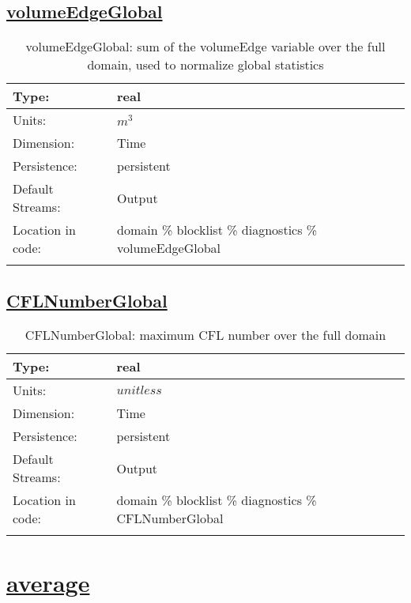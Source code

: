 \subsection[volumeEdgeGlobal]{\hyperref[sec:var_tab_diagnostics]{volumeEdgeGlobal}}
\label{subsec:var_sec_diagnostics_volumeEdgeGlobal}
\begin{center}
\begin{longtable}{| p{2.0in} | p{4.0in} |}
        \hline 
        Type: & real \\
        \hline 
        Units: & $m^3$ \\
        \hline 
        Dimension: & Time \\
        \hline 
        Persistence: & persistent \\
        \hline 
		 Default Streams: & Output  \\
        \hline 
		 Location in code: & domain \% blocklist \% diagnostics \% volumeEdgeGlobal \\
		 \hline 
    \caption{volumeEdgeGlobal: sum of the volumeEdge variable over the full domain, used to normalize global statistics}
\end{longtable}
\end{center}
\subsection[CFLNumberGlobal]{\hyperref[sec:var_tab_diagnostics]{CFLNumberGlobal}}
\label{subsec:var_sec_diagnostics_CFLNumberGlobal}
\begin{center}
\begin{longtable}{| p{2.0in} | p{4.0in} |}
        \hline 
        Type: & real \\
        \hline 
        Units: & $unitless$ \\
        \hline 
        Dimension: & Time \\
        \hline 
        Persistence: & persistent \\
        \hline 
		 Default Streams: & Output  \\
        \hline 
		 Location in code: & domain \% blocklist \% diagnostics \% CFLNumberGlobal \\
		 \hline 
    \caption{CFLNumberGlobal: maximum CFL number over the full domain}
\end{longtable}
\end{center}
\section[average]{\hyperref[sec:var_tab_average]{average}}
\label{sec:var_sec_average}
